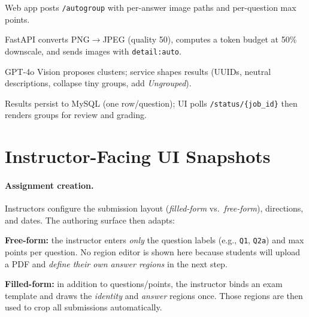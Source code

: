 \documentclass[ms,twoside,print]{nuthesis}
\begin{document}
\begin{compactenum}
  \item Web app posts \texttt{/autogroup} with per-answer image paths and per-question max points.
  \item FastAPI converts PNG$\rightarrow$JPEG (quality 50), computes a token budget at 50\% downscale, and sends images with \texttt{detail:auto}.
  \item GPT-4o Vision proposes clusters; service shapes results (UUIDs, neutral descriptions, collapse tiny groups, add \emph{Ungrouped}).
  \item Results persist to MySQL (one row/question); UI polls \texttt{/status/\{job\_id\}} then renders groups for review and grading.
\end{compactenum}

\section{Instructor-Facing UI Snapshots}
\paragraph{Assignment creation.}
Instructors configure the submission layout (\emph{filled-form} vs.\ \emph{free-form}), directions, and dates. The authoring surface then adapts:

\begin{compactitem}
  \item \textbf{Free-form:} the instructor enters \emph{only} the question labels (e.g., \texttt{Q1}, \texttt{Q2a}) and max points per question. No region editor is shown here because students will upload a PDF and \emph{define their own answer regions} in the next step.
  \item \textbf{Filled-form:} in addition to questions/points, the instructor binds an exam template and draws the \emph{identity} and \emph{answer} regions once. Those regions are then used to crop all submissions automatically.
\end{compactitem}
\end{document}
